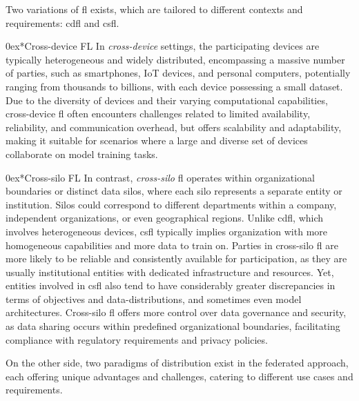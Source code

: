 \documentclass[conference]{IEEEtran}
\makeatletter
\def\paragraph{\@startsection{paragraph}{4}{\parindent}{0ex plus 0.1ex minus 0.1ex}%
{0ex}{\normalfont\normalsize\itshape}}%
\makeatother
\begin{document}
Two variations of \gls{fl} exists, which are tailored to different contexts and requirements: \gls{cdfl} and \gls{csfl}.

\paragraph*{Cross-device FL} In \emph{cross-device} settings, the participating devices are typically heterogeneous and widely distributed, encompassing a massive number of parties, such as smartphones, IoT devices, and personal computers, potentially ranging from thousands to billions, with each device possessing a small dataset.
Due to the diversity of devices and their varying computational capabilities, cross-device \gls{fl} often encounters challenges related to limited availability, reliability, and communication overhead, but offers scalability and adaptability, making it suitable for scenarios where a large and diverse set of devices collaborate on model training tasks.

\paragraph*{Cross-silo FL} In contrast, \emph{cross-silo} \gls{fl} operates within organizational boundaries or distinct data silos, where each silo represents a separate entity or institution.
Silos could correspond to different departments within a company, independent organizations, or even geographical regions.
Unlike \gls{cdfl}, which involves heterogeneous devices, \gls{csfl} typically implies organization with more homogeneous capabilities and more data to train on.
Parties in cross-silo \gls{fl} are more likely to be reliable and consistently available for participation, as they are usually institutional entities with dedicated infrastructure and resources.
Yet, entities involved in \gls{csfl} also tend to have considerably greater discrepancies in terms of objectives and data-distributions, and sometimes even model architectures.
Cross-silo \gls{fl} offers more control over data governance and security, as data sharing occurs within predefined organizational boundaries, facilitating compliance with regulatory requirements and privacy policies.

On the other side, two paradigms of distribution exist in the federated approach, each offering unique advantages and challenges, catering to different use cases and requirements.


\end{document}
